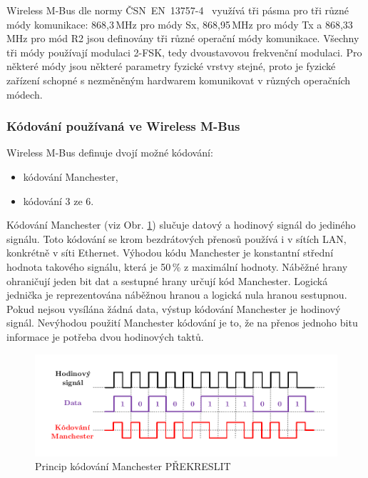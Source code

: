 Wireless M-Bus dle normy ČSN~EN~13757-4~\cite{Norma4} využívá tři pásma pro tři různé módy komunikace: 868,3\,MHz pro módy Sx, 868,95\,MHz pro módy Tx a 868,33\,MHz pro mód R2 jsou definovány tři různé operační módy komunikace. Všechny tři módy používají modulaci 2-FSK, tedy dvoustavovou frekvenční modulaci. Pro některé módy jsou některé parametry fyzické vrstvy stejné, proto je fyzické zařízení schopné s nezměněným hardwarem komunikovat v různých operačních módech.


\subsubsection{Kódování používaná ve Wireless M-Bus}
Wireless M-Bus definuje dvojí možné kódování: 
\begin{itemize}
	\item kódování Manchester,
	\item kódování 3 ze 6. 
\end{itemize}

Kódování Manchester (viz Obr. \ref{ObrazekManechester}) slučuje datový a hodinový signál do jediného signálu. Toto kódování se krom bezdrátových přenosů používá i v sítích LAN, konkrétně v síti Ethernet. Výhodou kódu Manchester je konstantní střední hodnota takového signálu, která je 50\,\% z maximální hodnoty. Náběžné hrany ohraničují jeden bit dat a sestupné hrany určují kód Manchester. Logická jednička je reprezentována náběžnou hranou a logická nula hranou sestupnou. Pokud nejsou vysílána žádná data, výstup kódování Manchester je hodinový signál. Nevýhodou použití Manchester kódování je to, že na přenos jednoho bitu informace je potřeba dvou hodinových taktů.

				\begin{figure}[!ht]
 \begin{center}
    \includegraphics[scale=0.3]{obrazky/wmbus_manchester}
  \end{center}
  \caption{Princip kódování Manchester \cite{Manchester} \colorbox[rgb]{1,0,0}{PŘEKRESLIT}}
	\label{ObrazekManechester}
\end{figure}


